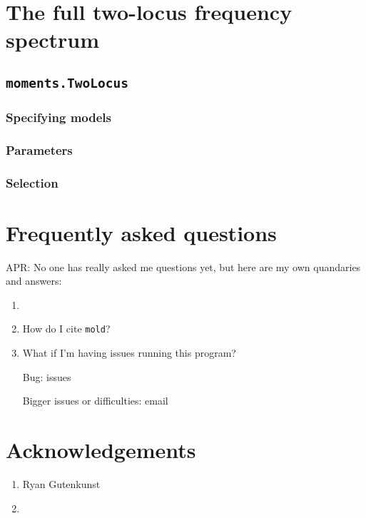 \documentclass[11pt]{article}
\newcommand{\comment}[1]{{\color{blue}APR: #1}}
\newcommand{\mold}{\texttt{mold}\xspace}
\begin{document}
\section{The full two-locus frequency spectrum}

\subsection{\texttt{moments.TwoLocus}}

\subsubsection{Specifying models}

\subsubsection{Parameters}

\subsubsection{Selection}


\section{Frequently asked questions}

\comment{No one has really asked me questions yet, but here are my own quandaries and answers:}

\begin{enumerate}

\item 

\item How do I cite \mold?

\item What if I'm having issues running this program?

Bug: issues

Bigger issues or difficulties: email

\end{enumerate}



\section{Acknowledgements}
\begin{enumerate}
\item Ryan Gutenkunst
\item 
\end{enumerate}



\end{document}
